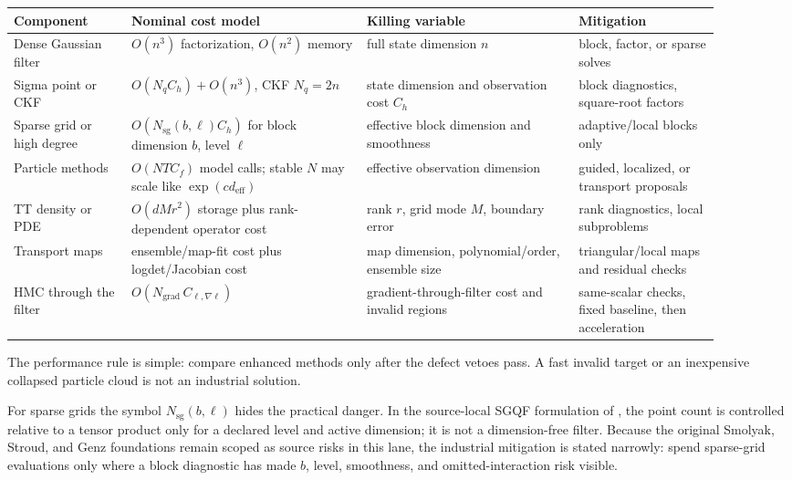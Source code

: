 \small
\begin{longtable}{@{}p{0.15\linewidth}p{0.30\linewidth}p{0.27\linewidth}p{0.18\linewidth}@{}}
\toprule
Component & Nominal cost model & Killing variable & Mitigation \\
\midrule
\endhead
Dense Gaussian filter &
\(O(n^3)\) factorization, \(O(n^2)\) memory &
full state dimension \(n\) &
block, factor, or sparse solves \\
Sigma point or CKF &
\(O(N_q C_h)+O(n^3)\), CKF \(N_q=2n\) &
state dimension and observation cost \(C_h\) &
block diagnostics, square-root factors \\
Sparse grid or high degree &
\(O(N_{\mathrm{sg}}(b,\ell)C_h)\) for block dimension \(b\), level \(\ell\) &
effective block dimension and smoothness &
adaptive/local blocks only \\
Particle methods &
\(O(NTC_f)\) model calls; stable \(N\) may scale like \(\exp(c d_{\mathrm{eff}})\) &
effective observation dimension &
guided, localized, or transport proposals \\
TT density or PDE &
\(O(dMr^2)\) storage plus rank-dependent operator cost &
rank \(r\), grid mode \(M\), boundary error &
rank diagnostics, local subproblems \\
Transport maps &
ensemble/map-fit cost plus logdet/Jacobian cost &
map dimension, polynomial/order, ensemble size &
triangular/local maps and residual checks \\
HMC through the filter &
\(O(N_{\mathrm{grad}}\, C_{\ell,\nabla\ell})\) &
gradient-through-filter cost and invalid regions &
same-scalar checks, fixed baseline, then acceleration \\
\bottomrule
\end{longtable}
\normalsize

The performance rule is simple: compare enhanced methods only after the defect
vetoes pass.  A fast invalid target or an inexpensive collapsed particle cloud
is not an industrial solution.

For sparse grids the symbol \(N_{\mathrm{sg}}(b,\ell)\) hides the practical
danger.  In the source-local SGQF formulation of \citet{jia2012sparsegrid},
the point count is controlled relative to a tensor product only for a declared
level and active dimension; it is not a dimension-free filter.  Because the
original Smolyak, Stroud, and Genz foundations remain scoped as source risks in
this lane, the industrial mitigation is stated narrowly: spend sparse-grid
evaluations only where a block diagnostic has made \(b\), level, smoothness,
and omitted-interaction risk visible.

